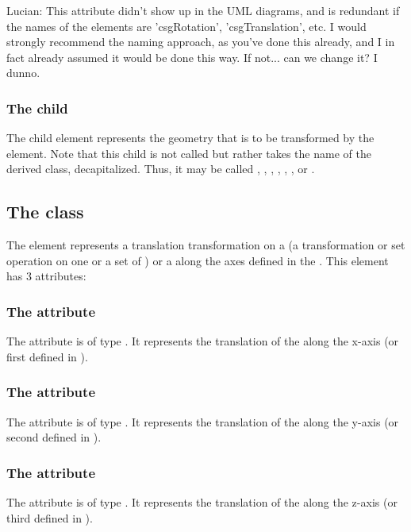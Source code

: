 {\color{red} Lucian: \notice This attribute didn't show up in the UML diagrams, and is redundant if the names of the elements are 'csgRotation', 'csgTranslation', etc.  I would strongly recommend the naming approach, as you've done this already, and I in fact already assumed it would be done this way.  If not... can we change it?  I dunno.}

\subsubsection{The  child}

The child  element represents the geometry that is to be transformed by the \CSGTransformation element.  Note that this child is not called  but rather takes the name of the derived class, decapitalized.  Thus, it may be called , , , , , , or .


\subsection{The  class}
\label{CSGTranslation-class}
The \CSGTranslation element represents a translation transformation on a \CSGNode (a transformation or set operation on one or a set of \CSGPrimitives) or a \CSGPrimitive along the axes defined in the \Geometry. This element has 3 attributes:

\subsubsection{The  attribute}
The  attribute is of type . It represents the translation of the \CSGNode along the x-axis (or first \CoordinateComponent defined in \Geometry).

\subsubsection{The  attribute}
The  attribute is of type . It represents the translation of the \CSGNode along the y-axis (or second \CoordinateComponent defined in \Geometry).

\subsubsection{The  attribute}
The  attribute is of type . It represents the translation of the \CSGNode along the z-axis (or third \CoordinateComponent defined in \Geometry).


